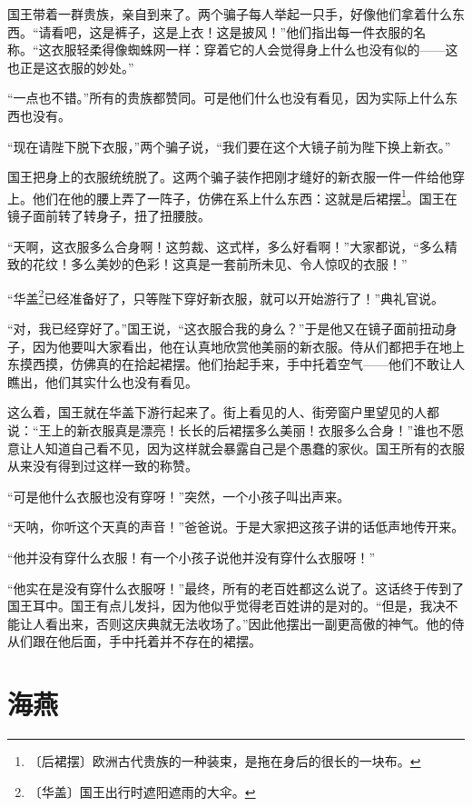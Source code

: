 \documentclass[12pt,UTF-8,openany]{ctexbook}
\begin{document}
\begin{normalsize}
    国王带着一群贵族，亲自到来了。两个骗子每人举起一只手，好像他们拿着什么东西。“请看吧，这是裤子，这是上衣！这是披风！”他们指出每一件衣服的名称。“这衣服轻柔得像蜘蛛网一样：穿着它的人会觉得身上什么也没有似的——这也正是这衣服的妙处。”
    
    “一点也不错。”所有的贵族都赞同。可是他们什么也没有看见，因为实际上什么东西也没有。
    
    “现在请陛下脱下衣服，”两个骗子说，“我们要在这个大镜子前为陛下换上新衣。”
    
    国王把身上的衣服统统脱了。这两个骗子装作把刚才缝好的新衣服一件一件给他穿上。他们在他的腰上弄了一阵子，仿佛在系上什么东西：这就是后裙摆\footnote{〔后裙摆〕欧洲古代贵族的一种装束，是拖在身后的很长的一块布。}。国王在镜子面前转了转身子，扭了扭腰肢。
    
    “天啊，这衣服多么合身啊！这剪裁、这式样，多么好看啊！”大家都说，“多么精致的花纹！多么美妙的色彩！这真是一套前所未见、令人惊叹的衣服！”
    
    “华盖\footnote{〔华盖〕国王出行时遮阳遮雨的大伞。}已经准备好了，只等陛下穿好新衣服，就可以开始游行了！”典礼官说。
    
    “对，我已经穿好了。”国王说，“这衣服合我的身么？”于是他又在镜子面前扭动身子，因为他要叫大家看出，他在认真地欣赏他美丽的新衣服。侍从们都把手在地上东摸西摸，仿佛真的在拾起裙摆。他们抬起手来，手中托着空气——他们不敢让人瞧出，他们其实什么也没有看见。
    
    这么着，国王就在华盖下游行起来了。街上看见的人、街旁窗户里望见的人都说：“王上的新衣服真是漂亮！长长的后裙摆多么美丽！衣服多么合身！”谁也不愿意让人知道自己看不见，因为这样就会暴露自己是个愚蠢的家伙。国王所有的衣服从来没有得到过这样一致的称赞。
    
    “可是他什么衣服也没有穿呀！”突然，一个小孩子叫出声来。
    
    “天呐，你听这个天真的声音！”爸爸说。于是大家把这孩子讲的话低声地传开来。
    
    “他并没有穿什么衣服！有一个小孩子说他并没有穿什么衣服呀！”
    
    “他实在是没有穿什么衣服呀！”最终，所有的老百姓都这么说了。这话终于传到了国王耳中。国王有点儿发抖，因为他似乎觉得老百姓讲的是对的。“但是，我决不能让人看出来，否则这庆典就无法收场了。”因此他摆出一副更高傲的神气。他的侍从们跟在他后面，手中托着并不存在的裙摆。
    
\end{normalsize}



\chapter{海燕}
\end{document}
